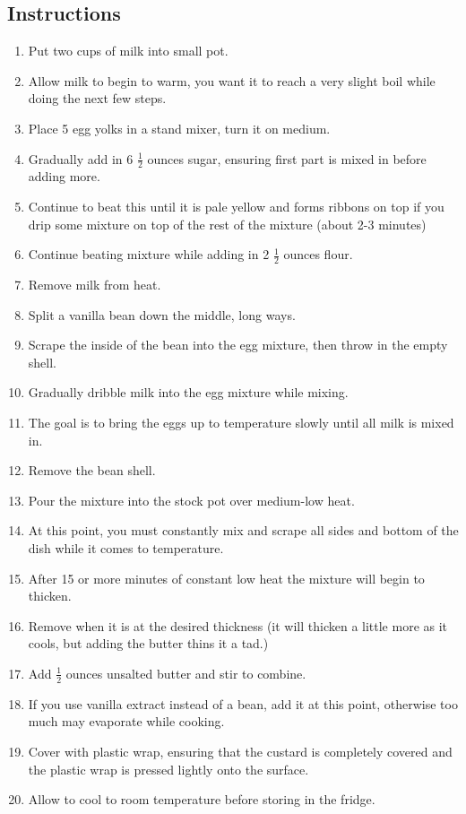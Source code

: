 \begin{multicols}{2}
\subsection*{Instructions}
\begin{enumerate}
    \item Put two cups of milk into small pot.
    \item Allow milk to begin to warm, you want it to reach a very slight boil while doing the next few steps.
    \item Place 5 egg yolks in a stand mixer, turn it on medium.
    \item Gradually add in 6 \( \frac{1}{2} \) ounces sugar, ensuring first part is mixed in before adding more.
    \item Continue to beat this until it is pale yellow and forms ribbons on top if you drip some mixture on top of the rest of the mixture (about 2-3 minutes)
    \item Continue beating mixture while adding in 2 \( \frac{1}{2} \) ounces flour.
    \item Remove milk from heat.
    \item Split a vanilla bean down the middle, long ways.
    \item Scrape the inside of the bean into the egg mixture, then throw in the empty shell.
    \item Gradually dribble milk into the egg mixture while mixing.
    \item The goal is to bring the eggs up to temperature slowly until all milk is mixed in.
    \item Remove the bean shell.
    \item Pour the mixture into the stock pot over medium-low heat.
    \item At this point, you must constantly mix and scrape all sides and bottom of the dish while it comes to temperature.
    \item After 15 or more minutes of constant low heat the mixture will begin to thicken.
    \item Remove when it is at the desired thickness (it will thicken a little more as it cools, but adding the butter thins it a tad.)
    \item Add \( \frac{1}{2} \) ounces unsalted butter and stir to combine.
    \item If you use vanilla extract instead of a bean, add it at this point, otherwise too much may evaporate while cooking.
    \item Cover with plastic wrap, ensuring that the custard is completely covered and the plastic wrap is pressed lightly onto the surface.
    \item Allow to cool to room temperature before storing in the fridge.
\end{enumerate}


\end{multicols}
